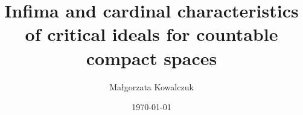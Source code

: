 \documentclass{amsart}
\theoremstyle{plain}
\theoremstyle{definition}
\theoremstyle{remark}
\begin{document}

\title[Infima and cardinal characteristics of critical ideals]{Infima and cardinal characteristics of critical ideals for countable compact spaces}


\author{Ma\l{}gorzata Kowalczuk}
\address{Institute of Mathematics\\ Faculty of Mathematics, Physics and Informatics\\ University of Gda\'{n}sk\\ ul.~Wita Stwosza 57\\ 80-308 Gda\'{n}sk\\ Poland}


\date{\today}



%
%
%



\end{document}

